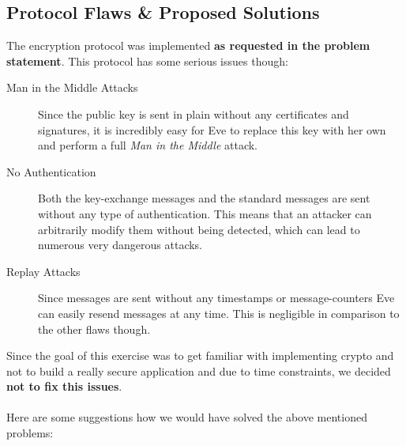 \documentclass[11pt, a4paper]{article}
\begin{document}
\subsection{Protocol Flaws \& Proposed Solutions}

The encryption protocol was implemented \textbf{as requested in the problem
	statement}. This protocol has some serious issues though:

\begin{description}
	
	\item[Man in the Middle Attacks] Since the public key is sent in plain
	without any certificates and signatures, it is incredibly easy for Eve to
	replace this key with her own and perform a full \textit{Man in the Middle}
	attack.
	
	\item[No Authentication] Both the key-exchange messages and the standard
	messages are sent without any type of authentication. This means that an
	attacker can arbitrarily modify them without being detected, which can
	lead to numerous very dangerous attacks.
	
	\item[Replay Attacks] Since messages are sent without any timestamps or
	message-counters Eve can easily resend messages at any time. This is
	negligible in comparison to the other flaws though.
	
\end{description}

Since the goal of this exercise was to get familiar with implementing crypto
and not to build a really secure application and due to time constraints, we
decided \textbf{not to fix this issues}.
\\\\
Here are some suggestions how we would have solved the above mentioned problems:
\end{document}
